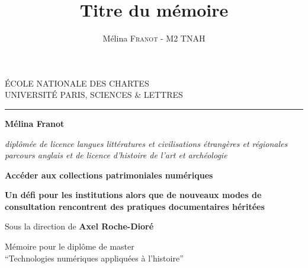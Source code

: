 \documentclass[12pt,twoside, openany]{book} %
\author{Mélina \textsc{Franot} - M2 TNAH}
\title{Titre du mémoire}
\begin{document}
	\begin{titlepage}
		\begin{center}
			
			\bigskip
			
			\begin{large}				
				ÉCOLE NATIONALE DES CHARTES\\
				UNIVERSITÉ PARIS, SCIENCES \& LETTRES
			\end{large}
			\begin{center}\rule{2cm}{0.02cm}\end{center}
			
			\bigskip
			\bigskip
			\bigskip
			\begin{Large}
				\textbf{Mélina Franot}\\
			\end{Large}
			\begin{normalsize} \textit{diplômée de licence langues littératures et civilisations étrangères et régionales parcours anglais et de licence d'histoire de l'art et archéologie}\\
			\end{normalsize}
			
			\bigskip
			\bigskip
			\bigskip
			
			\begin{Huge}
				\textbf{Accéder aux collections patrimoniales numériques}\\
			\end{Huge}
			\bigskip
			\bigskip
			\begin{LARGE}
				\textbf{Un défi pour les institutions alors que de nouveaux modes de consultation rencontrent des pratiques documentaires héritées}\\
			\end{LARGE}
			
			\bigskip
			\bigskip
			\bigskip
			\begin{large}
				Sous la direction de \textbf{Axel Roche-Dioré}
			\end{large}
			\vfill
			
			\begin{large}
				Mémoire 
				pour le diplôme de master \\
				\enquote{Technologies numériques appliquées à l'histoire} \\
			\end{large}
			
		\end{center}
	\end{titlepage}
\end{document}
